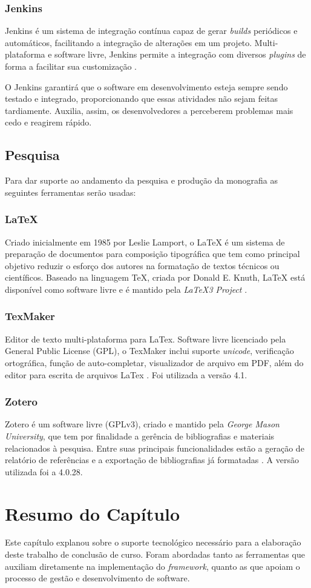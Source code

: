 \subsubsection{Jenkins}
Jenkins é um sistema de integração contínua capaz de gerar \textit{builds} periódicos e automáticos, facilitando a integração de alterações em um projeto. Multi-plataforma e software livre, Jenkins permite a integração com diversos \textit{plugins} de forma a facilitar sua customização \cite{jenkins2015}.
\par
\indent O Jenkins garantirá que o software em desenvolvimento esteja sempre sendo testado e integrado, proporcionando que essas atividades não sejam feitas tardiamente. Auxilia, assim, os desenvolvedores a perceberem problemas mais cedo e reagirem rápido.

\subsection{Pesquisa}
Para dar suporte ao andamento da pesquisa e produção da monografia as seguintes ferramentas serão usadas:

\subsubsection{LaTeX}
Criado inicialmente em 1985 por Leslie Lamport, o LaTeX é um sistema de preparação de documentos para composição tipográfica que tem como principal objetivo reduzir o esforço dos autores na formatação de textos técnicos ou científicos. Baseado na linguagem TeX, criada por Donald E. Knuth, LaTeX está disponível como software livre e é mantido pela \textit{LaTeX3 Project} \cite{latex2015}.

\subsubsection{TexMaker}
Editor de texto multi-plataforma para LaTex. Software livre licenciado pela General Public License (GPL), o TexMaker inclui suporte \textit{unicode}, verificação ortográfica, função de auto-completar, visualizador de arquivo em PDF, além do editor para escrita de arquivos LaTex \cite{texmaker2014}. Foi utilizada a versão 4.1.

\subsubsection{Zotero}
Zotero é um software livre (GPLv3), criado e mantido pela \textit{George Mason University}, que tem por finalidade a gerência de bibliografias e materiais relacionados à pesquisa. Entre suas principais funcionalidades estão a geração de relatório de referências e a exportação de bibliografias já formatadas \cite{zotero2015}. A versão utilizada foi a 4.0.28.

\section{Resumo do Capítulo}
Este capítulo explanou sobre o suporte tecnológico necessário para a elaboração deste trabalho de conclusão de curso. Foram abordadas tanto as ferramentas que auxiliam diretamente na implementação do \textit{framework}, quanto as que apoiam o processo de gestão e desenvolvimento de software.
